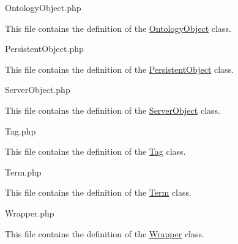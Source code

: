 Ontology\-Object.\-php

This file contains the definition of the \hyperlink{class_ontology_wrapper_1_1_ontology_object}{Ontology\-Object} class.

Persistent\-Object.\-php

This file contains the definition of the \hyperlink{class_ontology_wrapper_1_1_persistent_object}{Persistent\-Object} class.

Server\-Object.\-php

This file contains the definition of the \hyperlink{class_ontology_wrapper_1_1_server_object}{Server\-Object} class.

Tag.\-php

This file contains the definition of the \hyperlink{class_ontology_wrapper_1_1_tag}{Tag} class.

Term.\-php

This file contains the definition of the \hyperlink{class_ontology_wrapper_1_1_term}{Term} class.

Wrapper.\-php

This file contains the definition of the \hyperlink{class_ontology_wrapper_1_1_wrapper}{Wrapper} class. 